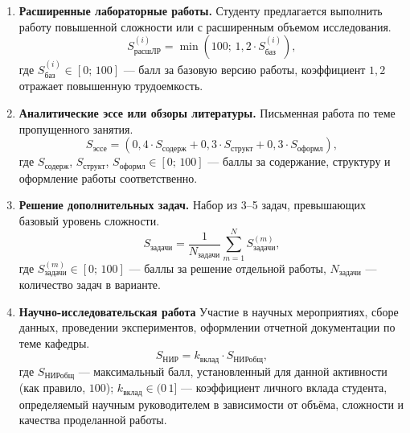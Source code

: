 \documentclass[10pt,a4paper]{article}
\begin{document}
    \begin{enumerate}
        \item \textbf{Расширенные лабораторные работы.}
        Студенту предлагается выполнить работу повышенной сложности или с расширенным объемом исследования.
        \begin{equation}
            S_{\text{расшЛР}}^{(i)} = \min\!\left(100;\, 1,2 \cdot S_{\text{баз}}^{(i)}\right),
        \end{equation}
        где $S_{\text{баз}}^{(i)} \in [0;\,100]$ --- балл за базовую версию работы, коэффициент $1,2$ отражает повышенную трудоемкость.

        \item \textbf{Аналитические эссе или обзоры литературы.}
        Письменная работа по теме пропущенного занятия.
        \begin{equation}
            S_{\text{эссе}} = \left(0,4 \cdot S_{\text{содерж}} + 0,3 \cdot S_{\text{структ}} + 0,3 \cdot S_{\text{оформл}}\right),
            \end{equation}
        где $S_{\text{содерж}}$, $S_{\text{структ}}$, $S_{\text{оформл}} \in [0;\,100]$ --- баллы за содержание, структуру и оформление работы соответственно.

        \item \textbf{Решение дополнительных задач.}
        Набор из 3--5 задач, превышающих базовый уровень сложности.
        \begin{equation}
            S_{\text{задачи}} = \frac{1}{N_{\text{задачи}}} \sum_{m=1}^{N} S_{\text{задачи}}^{(m)},
        \end{equation}
        где $ S_{\text{задачи}}^{(m)} \in [0;\,100]$ --- баллы за решение отдельной работы, $N_{\text{задачи}}$ --- количество задач в варианте.

        \item \textbf{Научно-исследовательская работа}
        Участие в научных мероприятиях, сборе данных, проведении экспериментов, оформлении отчетной документации по теме кафедры.
        \begin{equation}
            S_{\text{НИР}} = k_{\text{вклад}} \cdot S_{\text{НИРобщ}},
        \end{equation}
        где $S_{\text{НИРобщ}}$ --- максимальный балл, установленный для данной активности (как правило, $100$); $k_{\text{вклад}}  \in (0\,1]$ --- коэффициент личного вклада студента, определяемый научным руководителем в зависимости от объёма, сложности и качества проделанной работы.


\end{enumerate}
\end{document}
